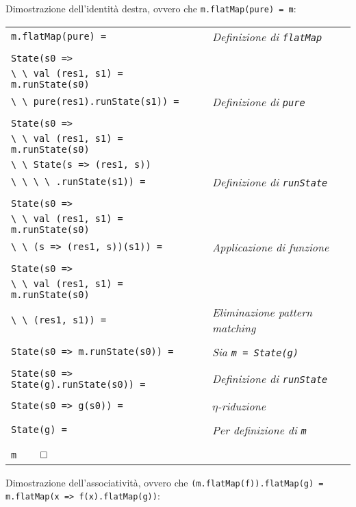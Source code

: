 Dimostrazione dell'identità destra, ovvero che \lstinline{m.flatMap(pure) = m}:

\begin{tabularx}{\textwidth}{ll}
\lstinline{m.flatMap(pure) =} & \emph{Definizione di \lstinline{flatMap}}\\
\\
\lstinline{State(s0 =>} \\
\lstinline{\ \ val (res1, s1) = m.runState(s0)}\\
\lstinline{\ \ pure(res1).runState(s1)) =} & \emph{Definizione di \lstinline{pure}}\\
\\
\lstinline{State(s0 =>} \\
\lstinline{\ \ val (res1, s1) = m.runState(s0)}\\
\lstinline{\ \ State(s => (res1, s))} \\
\lstinline{\ \ \ \ .runState(s1)) =}& \emph{Definizione di \lstinline{runState}}\\
\\
\lstinline{State(s0 =>} \\
\lstinline{\ \ val (res1, s1) = m.runState(s0)}\\
\lstinline{\ \ (s => (res1, s))(s1)) =} & \emph{Applicazione di funzione}\\
\\
\lstinline{State(s0 =>} \\
\lstinline{\ \ val (res1, s1) = m.runState(s0)}\\
\lstinline{\ \ (res1, s1)) =} & \emph{Eliminazione pattern matching}\\
\\
\lstinline{State(s0 => m.runState(s0)) =} & \emph{Sia \lstinline{m = State(g)}} \\
\\
\lstinline{State(s0 => State(g).runState(s0)) =} & \emph{Definizione di \lstinline{runState}} \\
\\
\lstinline{State(s0 => g(s0)) =} & \emph{$\eta$-riduzione} \\
\\
\lstinline{State(g) =} & \emph{Per definizione di \lstinline{m}} \\
\\
\lstinline{m} $\qed$ 
\end{tabularx}

Dimostrazione dell'associatività, ovvero che \lstinline{(m.flatMap(f)).flatMap(g) = m.flatMap(x => f(x).flatMap(g))}:

